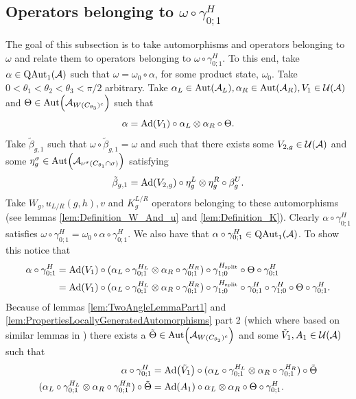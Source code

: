 \documentclass[11pt,a4paper,twoside]{article}
\numberwithin{equation}{section}
\begin{document}
	\subsection{Operators belonging to \texorpdfstring{$\omega\circ\gamma^H_{0;1}$}{}}
	The goal of this subsection is to take automorphisms and operators belonging to $\omega$ and relate them to operators belonging to $\omega\circ\gamma^H_{0;1}$. To this end, take $\alpha\in\QAut{\AA}$ such that $\omega=\omega_0\circ\alpha$, for some product state, $\omega_0$. Take $0<\theta_1<\theta_2<\theta_3<\pi/2$ arbitrary. Take $\alpha_L\in\Aut{\AA_L},\alpha_R\in\Aut{\AA_R},V_1\in\UU(\AA)$ and $\Theta\in\Aut{\AA_{W(C_{\theta_3})^c}}$ such that
	\begin{equation}
		\alpha=\Ad{V_1}\circ\alpha_L\otimes\alpha_R\circ\Theta.
	\end{equation}
	Take $\tilde{\beta}_{g,1}$ such that $\omega\circ\tilde{\beta}_{g,1}=\omega$ and such that there exists some $V_{2,g}\in\mathcal U(\mathcal A)$ and some $\eta_g^{\sigma}\in\Aut{\AA_{\nu^\sigma(C_{\theta_1}\cap \sigma)}}$ satisfying
	\begin{equation}
		\tilde{\beta}_{g,1}=\Ad{V_{2,g}}\circ\eta_{g}^L\otimes\eta_{g}^R\circ\beta_g^U.
	\end{equation}
	Take $W_g,u_{L/R}(g,h),v$ and $K_g^{L/R}$ operators belonging to these automorphisms (see lemmas \ref{lem:Definition_W_And_u} and \ref{lem:Definition_K}). Clearly $\alpha\circ\gamma^H_{0;1}$ satisfies $\omega\circ\gamma^{H}_{0;1}=\omega_0\circ\alpha\circ\gamma^{H}_{0;1}$. We also have that $\alpha\circ\gamma^{H}_{0;1}\in\QAut{\AA}$. To show this notice that
	\begin{align}
		\alpha\circ\gamma^{H}_{0;1}&=\Ad{V_1}\circ(\alpha_L\circ\gamma^{H_L}_{0;1}\otimes\alpha_R\circ\gamma^{H_R}_{0;1})\circ\gamma^{\Hsplit}_{1;0}\circ\Theta\circ\gamma^H_{0;1}\\
		&=\Ad{V_1}\circ(\alpha_L\circ\gamma^{H_L}_{0;1}\otimes\alpha_R\circ\gamma^{H_R}_{0;1})\circ\gamma^{\Hsplit}_{1;0}\circ\gamma^{H}_{0;1}\circ\gamma^{H}_{1;0}\circ\Theta\circ\gamma^H_{0;1}.
	\end{align}
	Because of lemmas \ref{lem:TwoAngleLemmaPart1} and \ref{lem:PropertiesLocallyGeneratedAutomorphisms} part 2 (which where based on similar lemmas in \cite{ogata2021h3gmathbb}) there exists a $\tilde{\Theta}\in\Aut{\AA_{W(C_{\theta_2})^c}}$ and some $\tilde V_1,A_1\in\mathcal U(\mathcal A)$ such that
	\begin{align}
		\alpha\circ\gamma^H_{0;1}&=\Ad{\tilde V_1}\circ(\alpha_L\circ\gamma^{H_L}_{0;1}\otimes\alpha_R\circ\gamma^{H_R}_{0;1})\circ\tilde\Theta\\
		\label{eq:ProofThatTheH2IndexIsInvariantUnderLGA's_Definition_A1}
		(\alpha_L\circ\gamma^{H_L}_{0;1}\otimes\alpha_R\circ\gamma^{H_R}_{0;1})\circ\tilde\Theta&=\Ad{A_1}\circ \alpha_L\otimes\alpha_R\circ\Theta\circ\gamma^{H}_{0;1}.
	\end{align}
\end{document}
